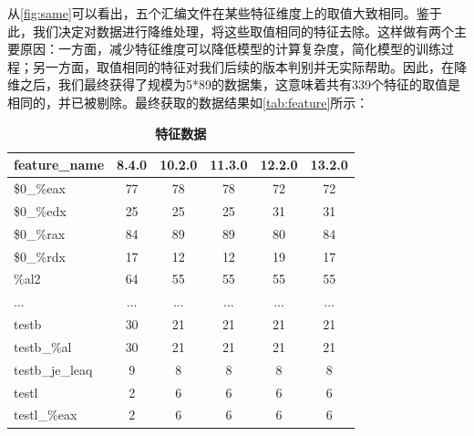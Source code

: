 从\autoref{fig:same}可以看出，五个汇编文件在某些特征维度上的取值大致相同。鉴于此，我们决定对数据进行降维处理，将这些取值相同的特征去除。这样做有两个主要原因：一方面，减少特征维度可以降低模型的计算复杂度，简化模型的训练过程；另一方面，取值相同的特征对我们后续的版本判别并无实际帮助。因此，在降维之后，我们最终获得了规模为5*89的数据集，这意味着共有339个特征的取值是相同的，并已被剔除。最终获取的数据结果如\autoref{tab:feature}所示：
\begin{table}[H]
\caption{\textbf{特征数据}}%
\label{tab:feature}
\centering%
\begin{tabular}{lccccc}%
\toprule%
 feature\_name&8.4.0 & 10.2.0 & 11.3.0 & 12.2.0 & 13.2.0 \\ 
\midrule%
\$0\_\%eax&77&78&78&72&72 \\
\$0\_\%edx&25 & 25 & 25 & 31 & 31 \\
\$0\_\%rax&84 & 89 & 89 & 80 & 84 \\
\$0\_\%rdx&17 & 12 & 12 & 19 & 17 \\
\%al2 & 64 & 55 & 55 & 55&55 \\
...&... & ... & ... & ... & ... \\
testb&30 & 21 & 21 & 21 & 21 \\
testb\_\%al&30 & 21 & 21 & 21 & 21 \\
testb\_je\_leaq&9 & 8 & 8 & 8 & 8 \\
testl&2 & 6 & 6 & 6 & 6 \\
testl\_\%eax&2 & 6 & 6 & 6 & 6 \\
\bottomrule%
\end{tabular}
\end{table}
   
